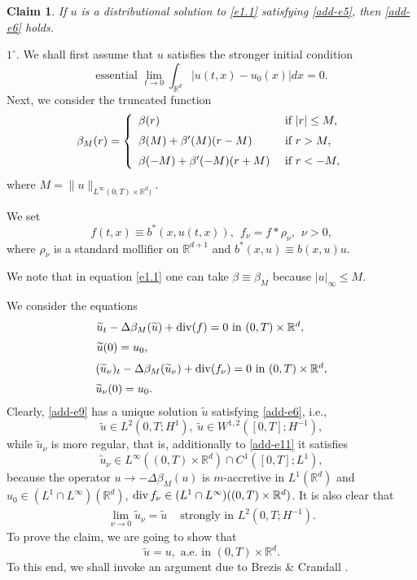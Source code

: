 \documentclass[12pt]{article}
\def\vsp{\vspace*{1,5mm}\\ }
\def\n{\noindent }
\def\dd{\displaystyle}
\def\barr{\begin{array}}
\def\earr{\end{array}}
\newtheorem{claim}[theorem]{Claim}
\theoremstyle{definition}
\def\1{^{-1}}
\def\vsp{\vspace*{2mm}\\ }
\def\rr{{\mathbb{R}}}
\def\9{{\infty}}
\def\wt{\widetilde}
\def\barr{\begin{array}}
\def\earr{\end{array}}
\def\dd{\displaystyle}
\def\n{\noindent }
\def\vsp{\vspace*{2mm}\\ }
\begin{document}
\begin{claim}\label{add-l1} If $u$ is a distributional solution to \eqref{e1.1} satisfying \eqref{add-e5}, then \eqref{add-e6} holds.
\end{claim}

\n{\bf Proof of Claim \ref{add-l1}.} $1^\circ$. We shall first assume   that $u$ satisfies   the stronger initial condition
\begin{equation}
\label{add-e7}
\mbox{essential }\lim_{t\to0} \int_{\rr^d} |u(t,x)-u_0(x)|dx=0.
\end{equation}
Next, we consider the truncated function
\begin{equation}
\label{add-e8}
\beta_M(r)=\left\{\barr{ll}
\beta(r)&\mbox{ if }|r|\le M,\vsp
\beta(M)+\beta'(M)(r-M)&\mbox{ if }r>M,\vsp
\beta(-M)+\beta'(-M)(r+M)&\mbox{ if }r<-M,\earr\right.
\end{equation}where $M=\|u\|_{L^\9(0,T)\times\rr^d)}.$

We set
$$f(t,x)\equiv b^*(x,u(t,x)),\ \ f_\nu=f*\rho_\nu,\ \ \nu>0,$$where $\rho_\nu$ is a standard mollifier on $\rr^{d+1}$ and $b^*(x,u)\equiv b(x,u)u$.

We note that in equation \eqref{e1.1} one can take $\beta\equiv\beta_M$ because $|u|_\9\le M.$

We consider the equations
\begin{equation}
\label{add-e9}
\barr{l}
\wt u_t-\Delta\beta_M(\wt u)+{\rm div}(f)=0\mbox{ in }(0,T)\times\rr^d,\vsp
\wt u(0)=u_0,\earr\qquad
\end{equation}
\begin{equation}
\label{add-e10}
\barr{l}
(\wt u_\nu)_t-\Delta\beta_M(\wt u_\nu)+{\rm div}(f_\nu)=0\mbox{ in }(0,T)\times\rr^d,\vsp
\wt u_\nu(0)=u_0.\earr
\end{equation}
Clearly, \eqref{add-e9} has a unique solution $\wt u$ satisfying \eqref{add-e6}, i.e.,
\begin{equation}
\label{add-e11}
\wt u \in L^2(0,T;H^1),\ \wt u\in W^{1,2}([0,T];H^{-1}),
\end{equation}
while $\wt u_\nu$ is more regular, that is,   additionally to \eqref{add-e11} it satisfies
\begin{equation}\label{add-e12}
\wt u_\nu\in L^\9((0,T)\times \rr^d)\cap C^1([0,T];L^1),
\end{equation}because the operator $u\to-\Delta\beta_M(u)$ is $m$-accretive in $L^1(\rr^d)$ and $u_0\in(L^1\cap L^\9)(\rr^d)$, ${\rm div}\,f_\nu\in(L^1\cap L^\9)((0,T)\times\rr^d)$. 
It is also clear that
\begin{equation}
\label{add-e13}
\barr{ll}
\dd\lim_{\nu\to0} \wt u_\nu=\wt u
&\mbox{ strongly in }L^2(0,T;H\1).\earr
\end{equation}
To prove the claim, we are going to show that
\begin{equation}
\label{add-e14}
\wt u=u,\mbox{ a.e. in }(0,T)\times\rr^d.
\end{equation}
To this end, we shall invoke an argument due to Brezis \& Crandall \cite{3}.
\end{document}
